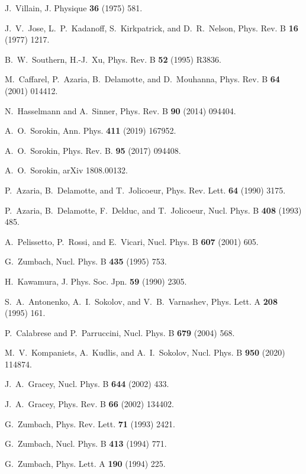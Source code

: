 \documentclass[final,twocolumn]{elsarticle}
\begin{document}
\begin{thebibliography}{00}
 J.~Villain, J. Physique {\bf36} (1975) 581.

 J.~V.~Jose, L.~P.~Kadanoff, S.~Kirkpatrick, and D.~R.~Nelson, Phys. Rev. B {\bf16} (1977) 1217.

 B.~W.~Southern, H.-J.~Xu, Phys. Rev. B {\bf52} (1995) R3836.

 M.~Caffarel, P.~Azaria, B.~Delamotte, and D.~Mouhanna, Phys. Rev. B {\bf64} (2001) 014412.

 N.~Hasselmann and A.~Sinner, Phys. Rev. B {\bf90} (2014) 094404.

 A.~O.~Sorokin, Ann. Phys. {\bf411} (2019) 167952.

 A.~O.~Sorokin, Phys. Rev. B. {\bf 95} (2017) 094408.

 A.~O.~Sorokin, arXiv 1808.00132.

 P.~Azaria, B.~Delamotte, and T.~Jolicoeur, Phys. Rev. Lett. {\bf64} (1990) 3175.

 P.~Azaria, B.~Delamotte, F.~Delduc, and T.~Jolicoeur, Nucl. Phys. B {\bf408} (1993) 485.

 A.~Pelissetto, P.~Rossi, and E.~Vicari, Nucl. Phys. B {\bf607} (2001) 605.

 G.~Zumbach, Nucl. Phys. B {\bf435} (1995) 753.

 H.~Kawamura, J. Phys. Soc. Jpn. {\bf59} (1990) 2305.

 S.~A.~Antonenko, A.~I.~Sokolov, and V.~B.~Varnashev, Phys. Lett. A {\bf 208} (1995) 161.

 P.~Calabrese and P.~Parruccini, Nucl. Phys. B {\bf 679} (2004) 568.

 M.~V.~Kompaniets, A.~Kudlis, and A.~I.~Sokolov, Nucl. Phys. B {\bf950} (2020) 114874.

 J.~A.~Gracey, Nucl. Phys. B {\bf644} (2002) 433.

 J.~A.~Gracey, Phys. Rev. B {\bf66} (2002) 134402.

 G.~Zumbach, Phys. Rev. Lett. {\bf 71} (1993) 2421.

 G.~Zumbach, Nucl. Phys. B {\bf 413} (1994) 771.

 G.~Zumbach, Phys. Lett. A {\bf190} (1994) 225.


\end{thebibliography}
\end{document}
